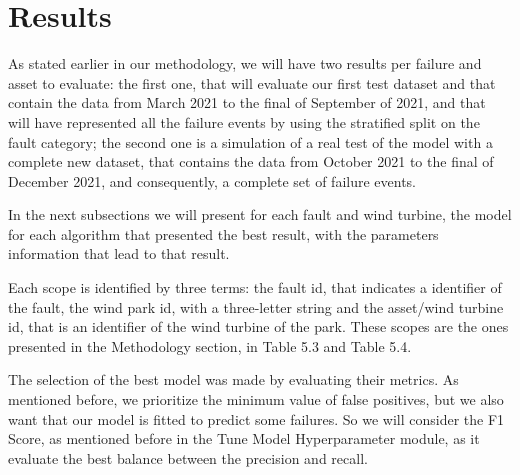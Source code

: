 


\section{Results}

As stated earlier in our methodology, we will have two results per failure and asset to evaluate: the first one, that will evaluate our first test dataset and that contain the data from March 2021 to the final of September of 2021, and that will have represented all the failure events by using the stratified split on the fault category; the second one is a simulation of a real test of the model with a complete new dataset, that contains the data from October 2021 to the final of December 2021, and consequently, a complete set of failure events.

In the next subsections we will present for each fault and wind turbine, the model for each algorithm that presented the best result, with the parameters information that lead to that result.


Each scope is identified by three terms: the fault id, that indicates a identifier of the fault, the wind park id, with a three-letter string and the asset/wind turbine id, that is an identifier of the wind turbine of the park. These scopes are the ones presented in the Methodology section, in Table 5.3 and Table 5.4.


The selection of the best model was made by evaluating their metrics. As mentioned before, we prioritize the minimum value of false positives, but we also want that our model is fitted to predict some failures.
So we will consider the F1 Score, as mentioned before in the Tune Model Hyperparameter module, as it evaluate the best balance between the precision and recall.


